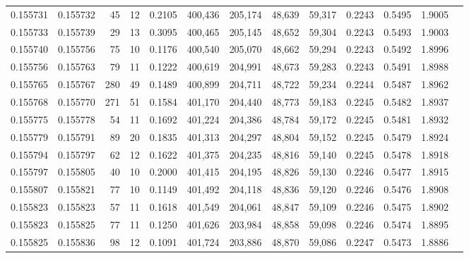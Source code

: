 \begin{tabular}{rrrrrrrrrrrrr}
0.155731 & 0.155732 &    45 &  12 &                                     0.2105 & 400,436 & 205,174 &  48,639 &  59,317 & 0.2243 & 0.5495 & 1.9005 \\
0.155733 & 0.155739 &    29 &  13 &                                     0.3095 & 400,465 & 205,145 &  48,652 &  59,304 & 0.2243 & 0.5493 & 1.9003 \\
0.155740 & 0.155756 &    75 &  10 &                                     0.1176 & 400,540 & 205,070 &  48,662 &  59,294 & 0.2243 & 0.5492 & 1.8996 \\
0.155756 & 0.155763 &    79 &  11 &                                     0.1222 & 400,619 & 204,991 &  48,673 &  59,283 & 0.2243 & 0.5491 & 1.8988 \\
0.155765 & 0.155767 &   280 &  49 &                                     0.1489 & 400,899 & 204,711 &  48,722 &  59,234 & 0.2244 & 0.5487 & 1.8962 \\
0.155768 & 0.155770 &   271 &  51 &                                     0.1584 & 401,170 & 204,440 &  48,773 &  59,183 & 0.2245 & 0.5482 & 1.8937 \\
0.155775 & 0.155778 &    54 &  11 &                                     0.1692 & 401,224 & 204,386 &  48,784 &  59,172 & 0.2245 & 0.5481 & 1.8932 \\
0.155779 & 0.155791 &    89 &  20 &                                     0.1835 & 401,313 & 204,297 &  48,804 &  59,152 & 0.2245 & 0.5479 & 1.8924 \\
0.155794 & 0.155797 &    62 &  12 &                                     0.1622 & 401,375 & 204,235 &  48,816 &  59,140 & 0.2245 & 0.5478 & 1.8918 \\
0.155797 & 0.155805 &    40 &  10 &                                     0.2000 & 401,415 & 204,195 &  48,826 &  59,130 & 0.2246 & 0.5477 & 1.8915 \\
0.155807 & 0.155821 &    77 &  10 &                                     0.1149 & 401,492 & 204,118 &  48,836 &  59,120 & 0.2246 & 0.5476 & 1.8908 \\
0.155823 & 0.155823 &    57 &  11 &                                     0.1618 & 401,549 & 204,061 &  48,847 &  59,109 & 0.2246 & 0.5475 & 1.8902 \\
0.155823 & 0.155825 &    77 &  11 &                                     0.1250 & 401,626 & 203,984 &  48,858 &  59,098 & 0.2246 & 0.5474 & 1.8895 \\
0.155825 & 0.155836 &    98 &  12 &                                     0.1091 & 401,724 & 203,886 &  48,870 &  59,086 & 0.2247 & 0.5473 & 1.8886 \\

\end{tabular}
